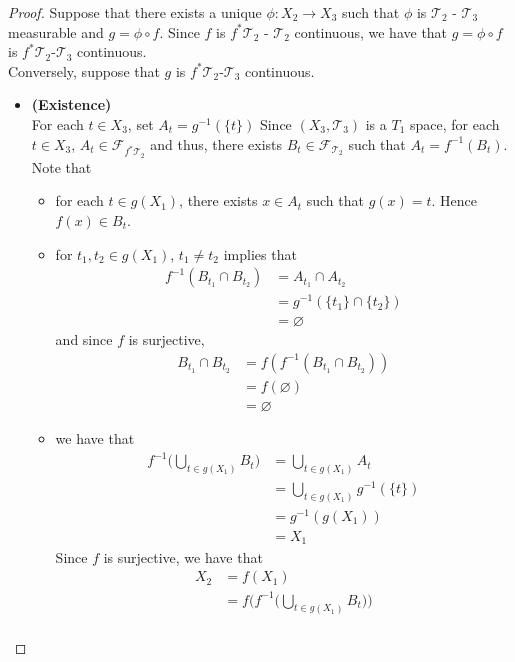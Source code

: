\documentclass[12pt]{amsart}
\theoremstyle{definition}
\newcommand{\MF}{\mathcal{F}}
\newcommand{\MT}{\mathcal{T}}
\begin{document}
	\begin{proof}
	
	Suppose that there exists a unique $\phi: X_2 \rightarrow X_3$ such that $\phi$ is $\MT_2$ - $\MT_3$ measurable and $g = \phi \circ f$. Since $f$ is $f^* \MT_2$ - $\MT_2$ continuous, we have that $g = \phi \circ f$ is $f^*\MT_2$-$\MT_3$ continuous.  \\
	Conversely, suppose that $g$ is $f^*\MT_2$-$\MT_3$ continuous. \\
	\begin{itemize}
	\item \textbf{(Existence)} \\
	For each $t \in X_3$, set $A_t = g^{-1}(\{t\})$ Since $(X_3, \MT_3)$ is a $T_1$ space, for each $t \in X_3$, $A_t \in \MF_{f^*\MT_2}$ and thus, there exists $B_t \in \MF_{\MT_2}$ such that $A_t = f^{-1}(B_t)$. \\
	Note that 
	\begin{itemize}
	\item for each $t \in g(X_1)$, there exists $x \in A_t$ such that $g(x) = t$. Hence $f(x) \in B_t$.\\
	\item for $t_1, t_2 \in g(X_1)$, $t_1 \neq t_2$ implies that
	\begin{align*}
	f^{-1}(B_{t_1} \cap B_{t_2}) 
	&= A_{t_1} \cap A_{t_2} \\
	&= g^{-1}(\{t_1\} \cap \{t_2\}) \\
	&= \varnothing
	\end{align*}	 
	and since $f$ is surjective, 
	\begin{align*}
	B_{t_1} \cap  B_{t_2} 
	& = f(f^{-1}(B_{t_1} \cap  B_{t_2} )) \\
	&= f(\varnothing) \\
	&= \varnothing
	\end{align*}
	\item we have that 
	\begin{align*}
	f^{-1} \bigg( \bigcup_{t \in g(X_1)} B_t\bigg) 
	&=  \bigcup_{t \in g(X_1)} A_t \\
	&= \bigcup_{t \in g(X_1)} g^{-1}(\{t\}) \\
	&= g^{-1}(g(X_1)) \\
	&= X_1
	\end{align*}
	Since $f$ is surjective, we have that 
	\begin{align*}
	X_2
	&= f(X_1) \\
	&= f \bigg( f^{-1} \bigg( \bigcup_{t \in g(X_1)} B_t\bigg)  \bigg) \\

\end{align*}
\end{itemize}
\end{itemize}
\end{proof}
\end{document}
